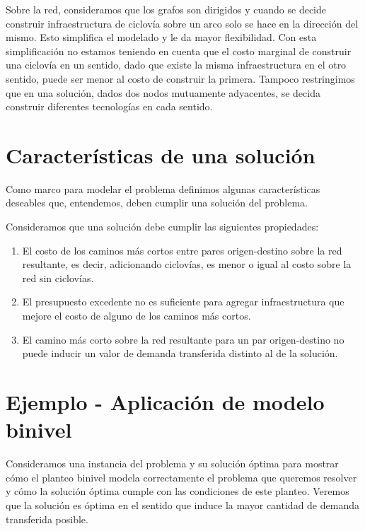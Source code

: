 Sobre la red, consideramos que los grafos son dirigidos y cuando se decide construir infraestructura de ciclovía sobre un arco solo se hace en la dirección del mismo. Esto simplifica el modelado y le da mayor flexibilidad. Con esta simplificación no estamos teniendo en cuenta que el costo marginal de construir una ciclovía en un sentido, dado que existe la misma infraestructura en el otro sentido, puede ser menor al costo de construir la primera. Tampoco restringimos que en una solución, dados dos nodos mutuamente adyacentes, se decida construir diferentes tecnologías en cada sentido.

\section{Características de una solución}
\label{sect:solutioncharacteristics}

Como marco para modelar el problema definimos algunas características deseables que, entendemos, deben cumplir una solución del problema.

Consideramos que una solución debe cumplir las siguientes propiedades:

\begin{enumerate}
    \item{El costo de los caminos más cortos entre pares origen-destino sobre la red resultante, es decir, adicionando ciclovías, es menor o igual al costo sobre la red sin ciclovías.}
  \item{\label{budgetexcess} El presupuesto excedente no es suficiente para agregar infraestructura que mejore el costo de alguno de los caminos más cortos.}
  \item{El camino más corto sobre la red resultante para un par origen-destino no puede inducir un valor de demanda transferida distinto al de la solución.}
\end{enumerate}

\section{Ejemplo - Aplicación de modelo binivel}
\label{sect:example1}

Consideramos una instancia del problema y su solución óptima para mostrar cómo el planteo binivel modela correctamente el problema que queremos resolver y cómo la solución óptima cumple con las condiciones de este planteo. Veremos que la solución es óptima en el sentido que induce la mayor cantidad de demanda transferida posible.

